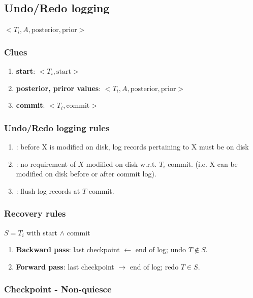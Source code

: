 \documentclass[a4paper]{report}
\begin{document}
\subsection{Undo/Redo logging}
$<T_i, A, \text{posterior}, \text{prior}>$
\subsubsection{Clues}
\begin{enumerate}
\item \textbf{start}: $<T_i, \text{start}>$
\item \textbf{posterior, priror values}: $<T_i, A, \text{posterior}, \text{prior}>$
\item \textbf{commit}: $<T_i, \text{commit}>$
\end{enumerate}

\subsubsection{Undo/Redo logging rules}
\begin{enumerate}
\item {}: before X is modified on disk, log records pertaining to X must be on disk
\item {}: no requirement of $X$ modified on disk w.r.t. $T_i$ commit. (i.e. X can be modified on disk before or after commit log).
\item {}: flush log records at $T$ commit.
\end{enumerate}

\subsubsection{Recovery rules}
$S = T_i$ with start $\wedge$ commit
\begin{enumerate}
\item \textbf{Backward pass}: last checkpoint $\leftarrow$ end of log; undo $T \notin S$.
\item \textbf{Forward pass}: last checkpoint $\rightarrow$ end of log; redo $T \in S$.
\end{enumerate}

\subsubsection{Checkpoint - Non-quiesce}
\end{document}
